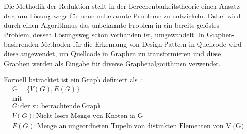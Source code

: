 Die Methodik der Reduktion stellt in der Berechenbarkeitstheorie einen Ansatz dar, um Lösungswege für neue unbekannte Probleme zu entwickeln. Dabei wird durch einen Algorithmus das unbekannte Problem in ein bereits gelöstes Problem, dessen Lösungsweg schon vorhanden ist, umgewandelt.
In Graphen-basierenden Methoden für die Erkennung von Design Pattern in Quellcode wird diese angewendet, um Quellcode in Graphen zu transformieren und diese Graphen werden als Eingabe für diverse Graphenalgorithmen verwendet.

\pagebreak

Formell betrachtet ist ein Graph definiert als~\cite[S. 9]{Siu1998IntroductionTG}:
\begin{align*}
& \text{G} = \{V(G), E(G)\}
&\\
&\text{mit}
&\\
&G : \text{der zu betrachtende Graph}\\
&V (G): \text{Nicht leere Menge von Knoten in G}\\
&E (G): \text{Menge an ungeordneten Tupeln von distinkten Elementen von V (G)}
\end{align*}

